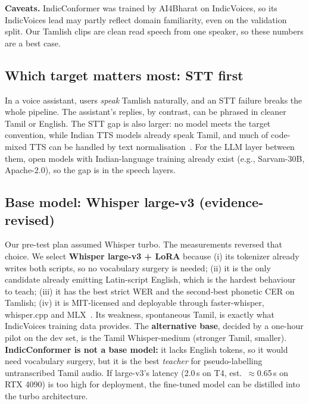 \documentclass[conference]{IEEEtran}
\begin{document}
\textbf{Caveats.} IndicConformer was trained by AI4Bharat on IndicVoices, so its IndicVoices lead may partly reflect domain familiarity, even on the validation split. Our Tamlish clips are clean read speech from one speaker, so these numbers are a best case.

\subsection{Which target matters most: STT first}
In a voice assistant, users \emph{speak} Tamlish naturally, and an STT failure breaks the whole pipeline. The assistant's replies, by contrast, can be phrased in cleaner Tamil or English. The STT gap is also larger: no model meets the target convention, while Indian TTS models already speak Tamil, and much of code-mixed TTS can be handled by text normalisation~\cite{gh_hinglishtts}. For the LLM layer between them, open models with Indian-language training already exist (e.g., Sarvam-30B, Apache-2.0), so the gap is in the speech layers.

\subsection{Base model: Whisper large-v3 (evidence-revised)}
Our pre-test plan assumed Whisper turbo. The measurements reversed that choice. We select \textbf{Whisper large-v3 + LoRA} because (i) its tokenizer already writes both scripts, so no vocabulary surgery is needed; (ii) it is the only candidate already emitting Latin-script English, which is the hardest behaviour to teach; (iii) it has the best strict WER and the second-best phonetic CER on Tamlish; (iv) it is MIT-licensed and deployable through faster-whisper, whisper.cpp and MLX~\cite{gh_fasterwhisper,gh_whispercpp,gh_mlxwhisper}. Its weakness, spontaneous Tamil, is exactly what IndicVoices training data provides. The \textbf{alternative base}, decided by a one-hour pilot on the dev set, is the Tamil Whisper-medium (stronger Tamil, smaller). \textbf{IndicConformer is not a base model:} it lacks English tokens, so it would need vocabulary surgery, but it is the best \emph{teacher} for pseudo-labelling untranscribed Tamil audio. If large-v3's latency (2.0\,s on T4, est.\ $\approx$0.65\,s on RTX 4090) is too high for deployment, the fine-tuned model can be distilled into the turbo architecture.
\end{document}
